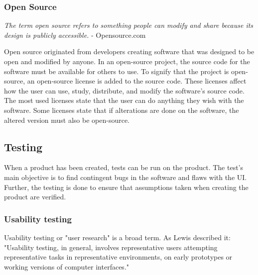 \subsubsection{Open Source}%
\label{ssub:Open Source}

\textit{The term open source refers to something people can modify and share because its design is publicly accessible.} - Opensource.com 

Open source originated from developers creating software that was designed to be open and modified by anyone. In an open-source project, the source code for the software must be available for others to use. To signify that the project is open-source, an open-source license is added to the source code. These licenses affect how the user can use, study, distribute, and modify the software's source code. The most used licenses state that the user can do anything they wish with the software. Some licenses state that if alterations are done on the software, the altered version must also be open-source. 







\subsection{Testing}%
\label{sub:Testing}
When a product has been created, tests can be run on the product. The test's main objective is to find contingent bugs in the software and flaws with the UI. Further, the testing is done to ensure that assumptions taken when creating the product are verified.

\subsubsection{Usability testing}%
\label{ssub:User testing}
Usability testing or "user research" is a broad term. As Lewis\cite{lewis2006usability} described it: "Usability testing, in general, involves representative users attempting representative tasks in representative environments, on early prototypes or working versions of computer interfaces." 

